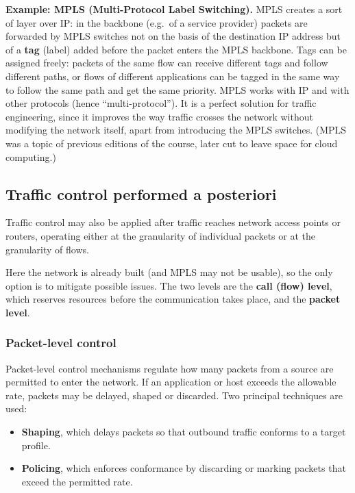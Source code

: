 \textbf{Example: MPLS (Multi-Protocol Label Switching).} MPLS creates a sort of layer over IP: in the backbone (e.g.\ of a service provider) packets are forwarded by MPLS switches not on the basis of the destination IP address but of a \textbf{tag} (label) added before the packet enters the MPLS backbone. Tags can be assigned freely: packets of the same flow can receive different tags and follow different paths, or flows of different applications can be tagged in the same way to follow the same path and get the same priority. MPLS works with IP and with other protocols (hence ``multi-protocol''). It is a perfect solution for traffic engineering, since it improves the way traffic crosses the network without modifying the network itself, apart from introducing the MPLS switches. (MPLS was a topic of previous editions of the course, later cut to leave space for cloud computing.)

\subsection{Traffic control performed a posteriori}

Traffic control may also be applied after traffic reaches network access points or routers, operating either at the granularity of individual packets or at the granularity of flows.

Here the network is already built (and MPLS may not be usable), so the only option is to mitigate possible issues. The two levels are the \textbf{call (flow) level}, which reserves resources before the communication takes place, and the \textbf{packet level}.

\subsubsection*{Packet-level control}

Packet-level control mechanisms regulate how many packets from a source are permitted to enter the network. If an application or host exceeds the allowable rate, packets may be delayed, shaped or discarded. Two principal techniques are used:

\begin{itemize}
\item \textbf{Shaping}, which delays packets so that outbound traffic conforms to a target profile.
\item \textbf{Policing}, which enforces conformance by discarding or marking packets that exceed the permitted rate.
\end{itemize}


